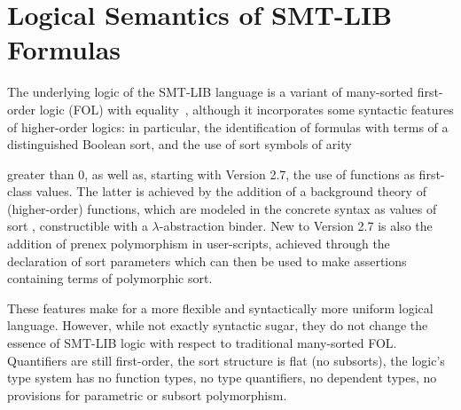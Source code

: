



\chapter{Logical Semantics of SMT-LIB Formulas} \label{chap:logical-semantics}
\thispagestyle{empty}

The underlying logic of the SMT-LIB language is a variant of many-sorted 
first-order logic (FOL) with equality~\cite{Man-MSL-93,Gal-86,Hen-01},
although it incorporates some syntactic  features 
of higher-order logics:
in particular, the identification of formulas with terms 
of a distinguished Boolean sort, and the use of sort symbols of arity 
\begin{newver}
greater than 0,
as well as, starting with Version 2.7, the use of functions as first-class values.
The latter is achieved by the addition of a background theory 
of (higher-order) functions,
which are modeled in the concrete syntax 
as values of sort ,
constructible with a $\lambda$-abstraction binder.
New to Version 2.7 is also the addition of prenex polymorphism in user-scripts,
achieved through the declaration of sort parameters which can then 
be used to make assertions containing terms of polymorphic sort.
\end{newver}

These features make for a more flexible and syntactically more uniform 
logical language.
However, while not exactly syntactic sugar, they do not change the essence 
of SMT-LIB logic with respect to traditional many-sorted FOL.
Quantifiers are still first-order, the sort structure is flat (no subsorts),
the logic's type system has no function types, 
no type quantifiers, no dependent types,
no provisions for parametric or subsort polymorphism.

